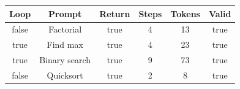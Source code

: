 \begin{table}[h]
\centering
\begin{tabular}{ |c|c|c|c|c|c| }
\hline
Loop & Prompt & Return & Steps & Tokens & Valid \\
\hline
false & Factorial & true & 4 & 13 & true \\
\hline
true & Find max & true & 4 & 23 & true \\
\hline
true & Binary search & true & 9 & 73 & true \\
\hline
false & Quicksort & true & 2 & 8 & true \\
\hline
\end{tabular}
\end{table}

